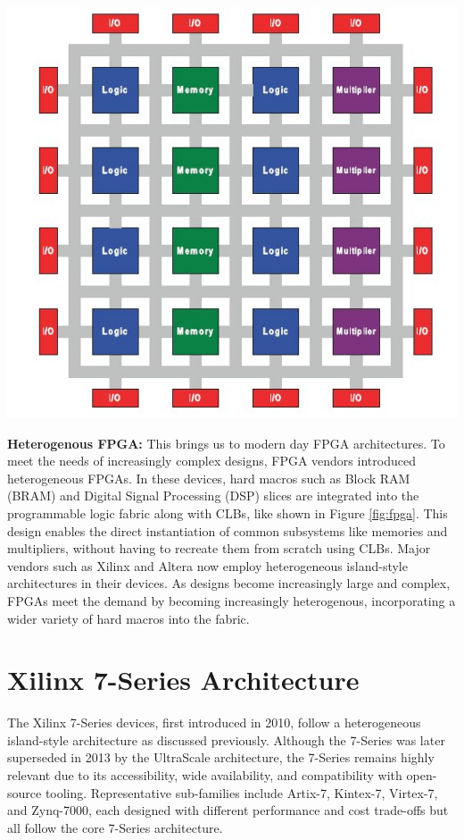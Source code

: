 \documentclass{article}
\begin{document}
\begin{multicols}{2}
    \newpage

    {
        \centering
        \includegraphics[width=\columnwidth]{figures/heterogenous_fpga_3.jpg}
        \label{fig:fpga}
    }
    \vspace{0.5cm}

    \textbf{Heterogenous FPGA:} \quad 
    This brings us to modern day FPGA architectures. 
    To meet the needs of increasingly complex designs, FPGA vendors introduced heterogeneous FPGAs. 
    In these devices, hard macros such as Block RAM (BRAM) and Digital Signal Processing (DSP) slices are integrated into the programmable logic fabric along with CLBs, like shown in Figure \ref{fig:fpga}. 
    This design enables the direct instantiation of common subsystems like memories and multipliers, without having to recreate them from scratch using CLBs. 
    Major vendors such as Xilinx and Altera now employ heterogeneous island-style architectures in their devices. 
    As designs become increasingly large and complex, FPGAs meet the demand by becoming increasingly heterogenous, incorporating a wider variety of hard macros into the fabric. 


\section{Xilinx 7-Series Architecture}
    \label{sec:7_series}
    The Xilinx 7-Series devices, first introduced in 2010, follow a heterogeneous island-style architecture as discussed previously. 
    Although the 7-Series was later superseded in 2013 by the UltraScale architecture, the 7-Series remains highly relevant due to its accessibility, wide availability, and compatibility with open-source tooling. 
    Representative sub-families include Artix-7, Kintex-7, Virtex-7, and Zynq-7000, each designed with different performance and cost trade-offs but all follow the core 7-Series architecture.



\end{multicols}
\end{document}
